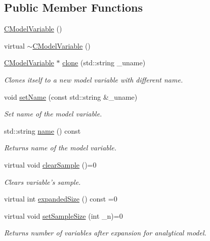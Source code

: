 \subsection*{Public Member Functions}
\begin{DoxyCompactItemize}
\item 
\hyperlink{class_go_s_u_m_1_1_c_model_variable_af87a883a7decdacb83591c41817a0a12}{C\-Model\-Variable} ()
\item 
virtual \hyperlink{class_go_s_u_m_1_1_c_model_variable_a54604e01443f4195b1ea3a197458dc07}{$\sim$\-C\-Model\-Variable} ()
\item 
\hyperlink{class_go_s_u_m_1_1_c_model_variable}{C\-Model\-Variable} $\ast$ \hyperlink{class_go_s_u_m_1_1_c_model_variable_ab70398d40549692929f1bfbff7281a56}{clone} (std\-::string \-\_\-uname)
\begin{DoxyCompactList}\small\item\em Clones itself to a new model variable with different name. \end{DoxyCompactList}\item 
void \hyperlink{class_go_s_u_m_1_1_c_model_variable_a2166acba16fad9f71f3fcf8b1f8cebb2}{set\-Name} (const std\-::string \&\-\_\-uname)
\begin{DoxyCompactList}\small\item\em Set name of the model variable. \end{DoxyCompactList}\item 
std\-::string \hyperlink{class_go_s_u_m_1_1_c_model_variable_ae305b19e3e4705db2a0c989b45dd58f9}{name} () const 
\begin{DoxyCompactList}\small\item\em Returns name of the model variable. \end{DoxyCompactList}\item 
virtual void \hyperlink{class_go_s_u_m_1_1_c_model_variable_af53c01e36cd1b8fdfec4e66a99776745}{clear\-Sample} ()=0
\begin{DoxyCompactList}\small\item\em Clears variable's sample. \end{DoxyCompactList}\item 
virtual int \hyperlink{class_go_s_u_m_1_1_c_model_variable_ab2889a825983ec58f9661a1e162904f3}{expanded\-Size} () const =0
\item 
virtual void \hyperlink{class_go_s_u_m_1_1_c_model_variable_a4424193dc952f62acaa2bb902b1585cd}{set\-Sample\-Size} (int \-\_\-n)=0
\begin{DoxyCompactList}\small\item\em Returns number of variables after expansion for analytical model. \end{DoxyCompactList}\item 

\end{DoxyCompactItemize}
